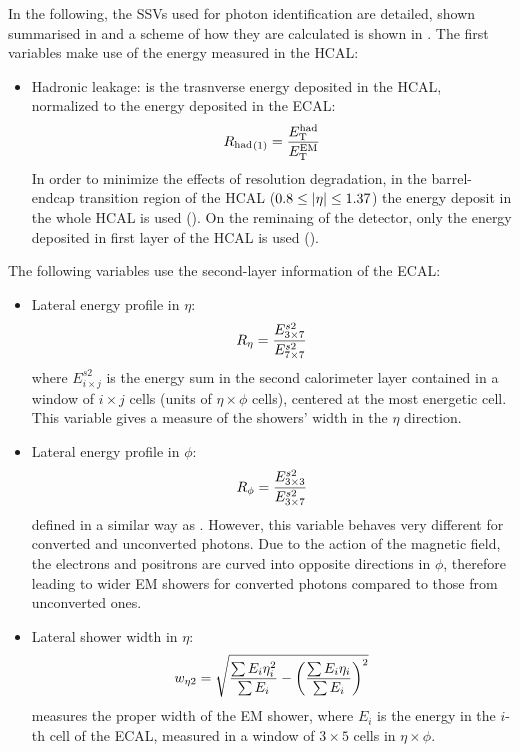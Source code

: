 In the following, the \acp{SSV} used for photon identification are detailed, shown summarised in \Tab{\ref{tab:pid_ss:ss:ss_variables}} and a scheme of how they are calculated is shown in \Fig{\ref{fig:pid_ss:ss:ss_variables}}.
The first variables make use of the energy measured in the \ac{HCAL}:
\begin{itemize}
    \item Hadronic leakage: is the trasnverse energy deposited in the \ac{HCAL}, normalized to the energy deposited in the \ac{ECAL}:
        \begin{equation}
            {\ensuremath{R_{\text{had}}}}_{(1)} = \frac{E_{\text{T}}^{\text{had}}}{E_{\text{T}}^{\text{EM}}}
        \end{equation}
        In order to minimize the effects of resolution degradation, in the barrel-endcap transition region of the \ac{HCAL} (\(0.8\leq |\eta|\leq 1.37\)) the energy deposit in the whole \ac{HCAL} is used (\rhad). On the reminaing of the detector, only the energy deposited in first layer of the \ac{HCAL} is used (\rhado).
\end{itemize}
The following variables use the second-layer information of the \ac{ECAL}:
\begin{itemize}
    \item Lateral energy profile in \(\eta\):
        \begin{equation}
            R_{\eta} = \frac{E_{3\times7}^{s2}}{E_{7\times7}^{s2}}
        \end{equation}
        where \(E_{i\times j}^{s2}\) is the energy sum in the second calorimeter layer contained in a window of \(i \times j \) cells (units of \(\eta \times \phi\) cells), centered at the most energetic cell. This variable gives a measure of the showers' width in the \(\eta\) direction.
    \item Lateral energy profile in \(\phi\):
        \begin{equation}
            R_{\phi} = \frac{E_{3\times3}^{s2}}{E_{3\times7}^{s2}}
        \end{equation}
        defined in a similar way as \reta. However, this variable behaves very different for converted and unconverted photons. Due to the action of the magnetic field, the electrons and positrons are curved into opposite directions in \(\phi\), therefore leading to wider \ac{EM} showers for converted photons compared to those from unconverted ones.
    \item Lateral shower width in \(\eta\):
        \begin{equation}
            w_{\eta 2} = \sqrt{
                \frac{\sum E_i \eta_i^2}{\sum E_i}
                -
                \left(\frac{\sum E_i \eta_i}{\sum E_i}\right)^2
            }
        \end{equation}
        measures the proper width of the \ac{EM} shower, where \(E_i\) is the energy in the \(i\)-th cell of the \ac{ECAL}, measured in a window of \(3\times 5 \) cells in \(\eta \times \phi\).
\end{itemize}
